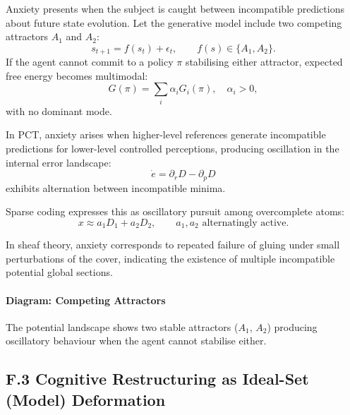 \documentclass[11pt,a4paper,twoside]{article}
\begin{document}
Anxiety presents when the subject is caught between incompatible predictions about future state evolution. Let the generative model include two competing attractors $A_1$ and $A_2$:
\[
s_{t+1} = f(s_t) + \epsilon_t, \qquad f(s) \in \{A_1,A_2\}.
\]
If the agent cannot commit to a policy $\pi$ stabilising either attractor, expected free energy becomes multimodal:
\[
G(\pi) = \sum_i \alpha_i G_i(\pi), \quad \alpha_i > 0,
\]
with no dominant mode.

In PCT, anxiety arises when higher-level references generate incompatible predictions for lower-level controlled perceptions, producing oscillation in the internal error landscape:
\[
\dot{e} = \partial_r D - \partial_p D
\]
exhibits alternation between incompatible minima.

Sparse coding expresses this as oscillatory pursuit among overcomplete atoms:
\[
x \approx a_1 D_1 + a_2 D_2, \qquad a_1, a_2 \text{ alternatingly active}.
\]

In sheaf theory, anxiety corresponds to repeated failure of gluing under small perturbations of the cover, indicating the existence of multiple incompatible potential global sections.

\paragraph{Diagram: Competing Attractors}

\begin{center}
\end{center}

The potential landscape shows two stable attractors ($A_1$, $A_2$) producing oscillatory behaviour when the agent cannot stabilise either.

\subsection*{F.3 Cognitive Restructuring as Ideal-Set (Model) Deformation}
\end{document}
